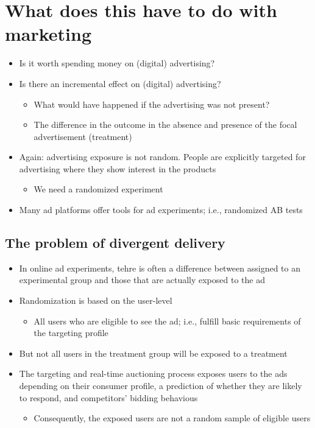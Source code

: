 \documentclass[10pt]{article}
\begin{document}
\section{What does this have to do with marketing}
\begin{itemize}
    \item Is it worth spending money on (digital) advertising?
    \item Is there an incremental effect on (digital) advertising?
    \begin{itemize}
        \item What would have happened if the advertising was not present?
        \item The difference in the outcome in the absence and presence of the focal advertisement (treatment)
    \end{itemize}
    \item Again: advertising exposure is not random. People are explicitly targeted for advertising where they show interest in the products
    \begin{itemize}
        \item We need a randomized experiment 
    \end{itemize}
    \item Many ad platforms offer tools for ad experiments; i.e., randomized AB tests
\end{itemize}
\subsection{The problem of divergent delivery}
\begin{itemize}
    \item In online ad experiments, tehre is often a difference between assigned to an experimental group and those that are actually exposed to the ad 
    \item Randomization is based on the user-level
    \begin{itemize}
        \item All users who are eligible to see the ad; i.e., fulfill basic requirements of the targeting profile 
    \end{itemize}
    \item But not all users in the treatment group will be exposed to a treatment 
    \item The targeting and real-time auctioning process exposes users to the ads depending on their consumer profile, a prediction of whether they are likely to respond, and competitors' bidding behavious 
    \begin{itemize}
        \item Consequently, the exposed users are not a random sample of eligible users
    \end{itemize}
\end{itemize}
\newpage 
\end{document}
